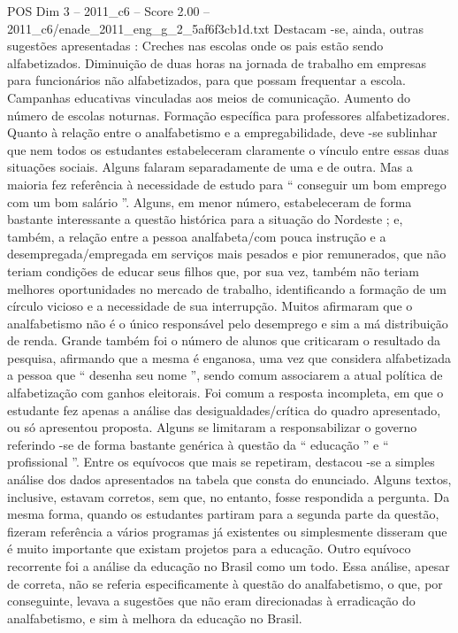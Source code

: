 \begin{textsample}{POS Dim 3 – 2011\_c6 – Score 2.00 – 2011\_c6/enade\_2011\_eng\_g\_2\_5af6f3cb1d.txt}
Destacam -se, ainda, outras sugestões apresentadas : Creches nas escolas onde os pais estão sendo alfabetizados.
Diminuição de duas horas na jornada de trabalho em empresas para funcionários não alfabetizados, para que possam frequentar a escola.
Campanhas educativas vinculadas aos meios de comunicação.
Aumento do número de escolas noturnas.
Formação específica para professores alfabetizadores.
Quanto à relação entre o analfabetismo e a empregabilidade, deve -se sublinhar que nem todos os estudantes estabeleceram claramente o vínculo entre essas duas situações sociais.
Alguns falaram separadamente de uma e de outra.
Mas a maioria fez referência à necessidade de estudo para “ conseguir um bom emprego com um bom salário ”.
Alguns, em menor número, estabeleceram de forma bastante interessante a questão histórica para a situação do Nordeste ; e, também, a relação entre a pessoa analfabeta/com pouca instrução e a desempregada/empregada em serviços mais pesados e pior remunerados, que não teriam condições de educar seus filhos que, por sua vez, também não teriam melhores oportunidades no mercado de trabalho, identificando a formação de um círculo vicioso e a necessidade de sua interrupção.
Muitos afirmaram que o analfabetismo não é o único responsável pelo desemprego e sim a má distribuição de renda.
Grande também foi o número de alunos que criticaram o resultado da pesquisa, afirmando que a mesma é enganosa, uma vez que considera alfabetizada a pessoa que “ desenha seu nome ”, sendo comum associarem a atual política de alfabetização com ganhos eleitorais.
Foi comum a resposta incompleta, em que o estudante fez apenas a análise das desigualdades/crítica do quadro apresentado, ou só apresentou proposta.
Alguns se limitaram a responsabilizar o governo referindo -se de forma bastante genérica à questão da “ educação ” e “ profissional ”.
Entre os equívocos que mais se repetiram, destacou -se a simples análise dos dados apresentados na tabela que consta do enunciado.
Alguns textos, inclusive, estavam corretos, sem que, no entanto, fosse respondida a pergunta.
Da mesma forma, quando os estudantes partiram para a segunda parte da questão, fizeram referência a vários programas já existentes ou simplesmente disseram que é muito importante que existam projetos para a educação.
Outro equívoco recorrente foi a análise da educação no Brasil como um todo.
Essa análise, apesar de correta, não se referia especificamente à questão do analfabetismo, o que, por conseguinte, levava a sugestões que não eram direcionadas à erradicação do analfabetismo, e sim à melhora da educação no Brasil.

\end{textsample}
